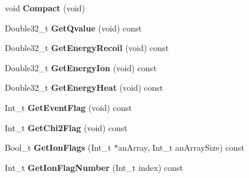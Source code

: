 \begin{DoxyCompactItemize}
\item 
\hypertarget{class_edw_h_l_a_single_bolo_sub_record_a70f1403c60c5d1f38be9685917602fea}{
void {\bfseries Compact} (void)}
\label{class_edw_h_l_a_single_bolo_sub_record_a70f1403c60c5d1f38be9685917602fea}

\item 
\hypertarget{class_edw_h_l_a_single_bolo_sub_record_ae2486463b17e686d7480a847ee382098}{
Double32\_\-t {\bfseries GetQvalue} (void) const }
\label{class_edw_h_l_a_single_bolo_sub_record_ae2486463b17e686d7480a847ee382098}

\item 
\hypertarget{class_edw_h_l_a_single_bolo_sub_record_a204400a80d8318106053bcf85a22298e}{
Double32\_\-t {\bfseries GetEnergyRecoil} (void) const }
\label{class_edw_h_l_a_single_bolo_sub_record_a204400a80d8318106053bcf85a22298e}

\item 
\hypertarget{class_edw_h_l_a_single_bolo_sub_record_a322f6505fd6d3c3c462445782f7fa23d}{
Double32\_\-t {\bfseries GetEnergyIon} (void) const }
\label{class_edw_h_l_a_single_bolo_sub_record_a322f6505fd6d3c3c462445782f7fa23d}

\item 
\hypertarget{class_edw_h_l_a_single_bolo_sub_record_a79800ce2d921d81961eca37c25918cb6}{
Double32\_\-t {\bfseries GetEnergyHeat} (void) const }
\label{class_edw_h_l_a_single_bolo_sub_record_a79800ce2d921d81961eca37c25918cb6}

\item 
\hypertarget{class_edw_h_l_a_single_bolo_sub_record_a214f49866438f1c92867af1a7bbd1a49}{
Int\_\-t {\bfseries GetEventFlag} (void) const }
\label{class_edw_h_l_a_single_bolo_sub_record_a214f49866438f1c92867af1a7bbd1a49}

\item 
\hypertarget{class_edw_h_l_a_single_bolo_sub_record_a490a9d063af7cef57bb1f6f465681a19}{
Int\_\-t {\bfseries GetChi2Flag} (void) const }
\label{class_edw_h_l_a_single_bolo_sub_record_a490a9d063af7cef57bb1f6f465681a19}

\item 
\hypertarget{class_edw_h_l_a_single_bolo_sub_record_ade1618a813f78a0609662c081453f3c4}{
Bool\_\-t {\bfseries GetIonFlags} (Int\_\-t $\ast$anArray, Int\_\-t anArraySize) const }
\label{class_edw_h_l_a_single_bolo_sub_record_ade1618a813f78a0609662c081453f3c4}

\item 
\hypertarget{class_edw_h_l_a_single_bolo_sub_record_aa82b5222dbff910b5d89548547eaacb2}{
Int\_\-t {\bfseries GetIonFlagNumber} (Int\_\-t index) const }
\label{class_edw_h_l_a_single_bolo_sub_record_aa82b5222dbff910b5d89548547eaacb2}


\end{DoxyCompactItemize}
